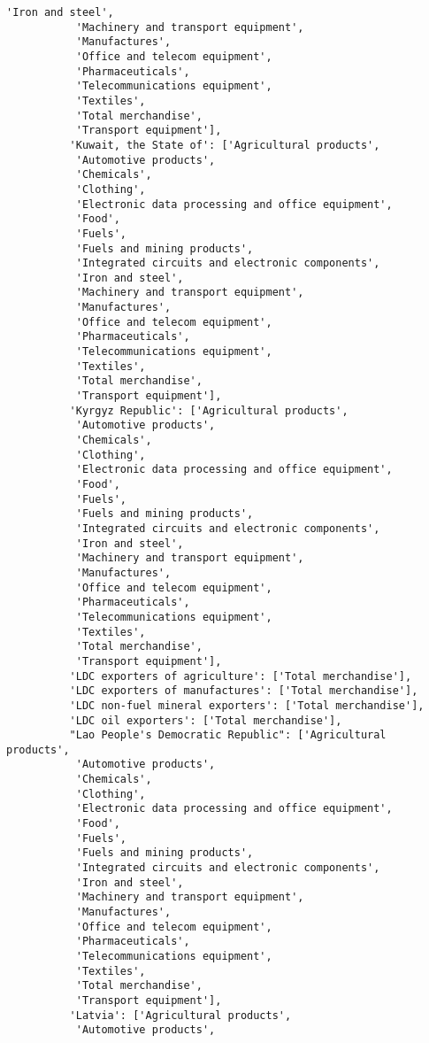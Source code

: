 \documentclass[11pt]{article}
\begin{document}
\begin{Verbatim}[commandchars=\\\{\}]
           'Iron and steel',
           'Machinery and transport equipment',
           'Manufactures',
           'Office and telecom equipment',
           'Pharmaceuticals',
           'Telecommunications equipment',
           'Textiles',
           'Total merchandise',
           'Transport equipment'],
          'Kuwait, the State of': ['Agricultural products',
           'Automotive products',
           'Chemicals',
           'Clothing',
           'Electronic data processing and office equipment',
           'Food',
           'Fuels',
           'Fuels and mining products',
           'Integrated circuits and electronic components',
           'Iron and steel',
           'Machinery and transport equipment',
           'Manufactures',
           'Office and telecom equipment',
           'Pharmaceuticals',
           'Telecommunications equipment',
           'Textiles',
           'Total merchandise',
           'Transport equipment'],
          'Kyrgyz Republic': ['Agricultural products',
           'Automotive products',
           'Chemicals',
           'Clothing',
           'Electronic data processing and office equipment',
           'Food',
           'Fuels',
           'Fuels and mining products',
           'Integrated circuits and electronic components',
           'Iron and steel',
           'Machinery and transport equipment',
           'Manufactures',
           'Office and telecom equipment',
           'Pharmaceuticals',
           'Telecommunications equipment',
           'Textiles',
           'Total merchandise',
           'Transport equipment'],
          'LDC exporters of agriculture': ['Total merchandise'],
          'LDC exporters of manufactures': ['Total merchandise'],
          'LDC non-fuel mineral exporters': ['Total merchandise'],
          'LDC oil exporters': ['Total merchandise'],
          "Lao People's Democratic Republic": ['Agricultural products',
           'Automotive products',
           'Chemicals',
           'Clothing',
           'Electronic data processing and office equipment',
           'Food',
           'Fuels',
           'Fuels and mining products',
           'Integrated circuits and electronic components',
           'Iron and steel',
           'Machinery and transport equipment',
           'Manufactures',
           'Office and telecom equipment',
           'Pharmaceuticals',
           'Telecommunications equipment',
           'Textiles',
           'Total merchandise',
           'Transport equipment'],
          'Latvia': ['Agricultural products',
           'Automotive products',

\end{Verbatim}
\end{document}
